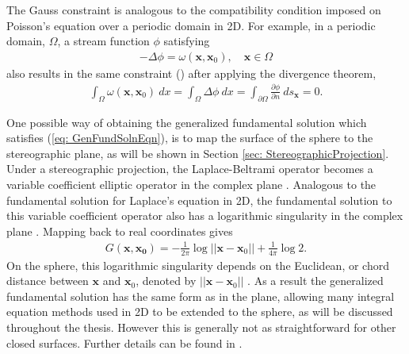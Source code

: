 \documentclass{sfuthesis}
\begin{document}
The Gauss constraint is analogous to the compatibility condition imposed on Poisson's equation over a periodic domain in 2D. For example, in a periodic domain, $\Omega$, a stream function $\phi$ satisfying 
\begin{align*}
	-\Delta \phi = \omega(\mathbf{x}, \mathbf{x}_0), \quad \mathbf{x} \in \Omega
\end{align*}
also results in the same constraint (\cite{Gock2010}) after applying the divergence theorem, 
\begin{align*}
	\int_{\Omega} \omega(\mathbf{x}, \mathbf{x}_0) \ dx = \int_{\Omega} \Delta \phi \  dx = \int_{\partial \Omega} \frac{\partial \phi}{\partial n}  \ ds_{\mathbf{x}} =0.
\end{align*}

One possible way of obtaining the generalized fundamental solution which satisfies (\ref{eq: GenFundSolnEqn}), is to map the surface of the sphere to the stereographic plane, as will be shown in Section \ref{sec: StereographicProjection}. Under a stereographic projection, the Laplace-Beltrami operator becomes a variable coefficient elliptic operator in the complex plane \cite{KropNig2014}. Analogous to the fundamental solution for Laplace's equation in 2D, the fundamental solution to this variable coefficient operator also has a logarithmic singularity in the complex plane \cite{Crowdy2006, GemmNigStein2008}. 
Mapping back to real coordinates gives 
\begin{align}
	G(\mathbf{x},\mathbf{x_0})=-\frac{1}{2\pi}\log||\mathbf{x}-{\mathbf{x}}_0||+\frac{1}{4\pi}\log2. \label{eq: GenFundSoln}
\end{align}
On the sphere, this logarithmic singularity depends on the Euclidean, or chord distance between $\mathbf{x}$ and $\mathbf{x}_0$, denoted by $||\mathbf{x}-{\mathbf{x}}_0||$ \cite{Drit15, GemmNigStein2008}. As a result the generalized fundamental solution has the same form as in the plane, allowing many integral equation methods used in 2D to be extended to the sphere, as will be discussed throughout the thesis. 
However this is generally not as straightforward for other closed surfaces. Further details can be found in \cite{Drit15, Boatto2008}.

\end{document}
